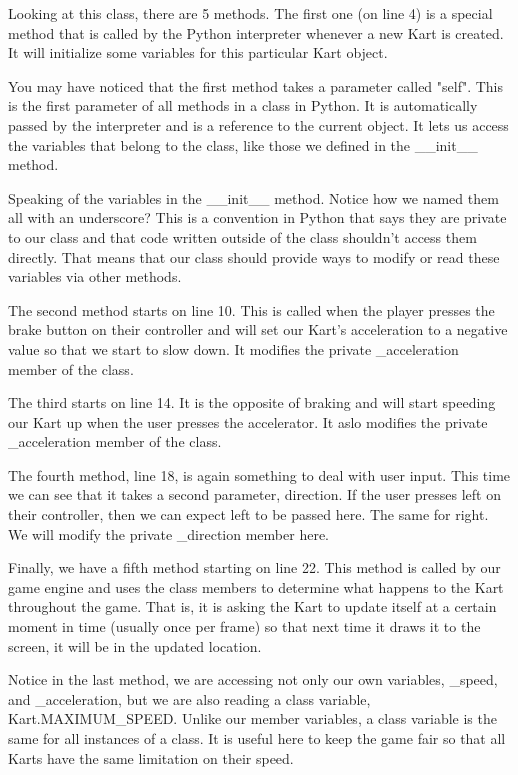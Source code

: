 Looking at this class, there are 5 methods. The first one (on line 4) is a special
method that is called by the Python interpreter whenever a new Kart is created. It
will initialize some variables for this particular Kart object.

You may have noticed that the first method takes a parameter called "self". This
is the first parameter of all methods in a class in Python. It is automatically passed
by the interpreter and is a reference to the current object. It lets us access the
variables that belong to the class, like those we defined in the \_\_init\_\_ method.

Speaking of the variables in the \_\_init\_\_ method. Notice how we named them all with
an underscore? This is a convention in Python that says they are private to our class
and that code written outside of the class shouldn't access them directly. That means
that our class should provide ways to modify or read these variables via other methods.

The second method starts on line 10. This is called when the player presses the
brake button on their controller and will set our Kart's acceleration to a negative
value so that we start to slow down. It modifies the private \_acceleration member of
the class.

The third starts on line 14. It is the opposite of braking and will start speeding
our Kart up when the user presses the accelerator. It aslo modifies the private
\_acceleration member of the class.

The fourth method, line 18, is again something to deal with user input. This time
we can see that it takes a second parameter, direction. If the user presses left on
their controller, then we can expect left to be passed here. The same for right. We
will modify the private \_direction member here.

Finally, we have a fifth method starting on line 22. This method is called by our
game engine and uses the class members to determine what happens to the Kart throughout
the game. That is, it is asking the Kart to update itself at a certain moment in time
(usually once per frame) so that next time it draws it to the screen, it will be
in the updated location.

Notice in the last method, we are accessing not only our own variables, \_speed, and
\_acceleration, but we are also reading a class variable, Kart.MAXIMUM\_SPEED. Unlike
our member variables, a class variable is the same for all instances of a class. It
is useful here to keep the game fair so that all Karts have the same limitation on
their speed.
